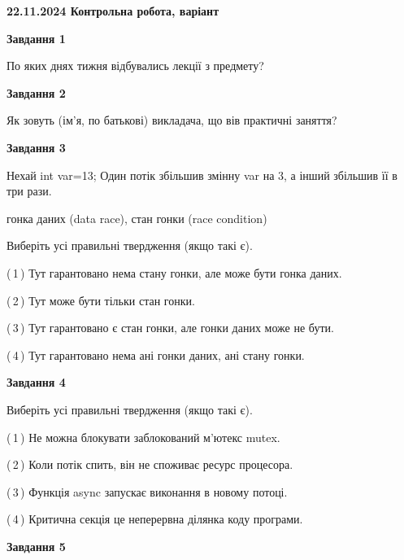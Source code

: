 \documentclass[12pt, ukrainian]{article}
\begin{document}
\begin {large}

\textbf{22.11.2024 Контрольна робота, варіант  }\par


{

\begin{center}
\textbf{Завдання 1}
\end{center}

По яких днях тижня відбувались лекції з предмету?


\begin{center}
\textbf{Завдання 2}
\end{center}

Як зовуть (ім'я, по батькові) викладача, що вів практичні заняття?


\begin{center}
\textbf{Завдання 3}
\end{center}

Нехай int var=13; Один потік збільшив змінну var на 3, а інший збільшив її в три рази.

гонка даних (data race), стан гонки (race condition)

Виберіть усі правильні твердження (якщо такі є).\par
\vspace{2mm}
(\,1\,) Тут гарантовано нема стану гонки, але може бути гонка даних.%

(\,2\,) Тут може бути тільки стан гонки.%

(\,3\,) Тут гарантовано є стан гонки, але гонки даних може не бути.%

(\,4\,) Тут гарантовано нема ані гонки даних, ані стану гонки.%


\begin{center}
\textbf{Завдання 4}
\end{center}

Виберіть усі правильні твердження (якщо такі є).\par
\vspace{2mm}

(\,1\,) Не можна блокувати заблокований м’ютекс mutex.%

(\,2\,) Коли потік спить, він не споживає ресурс процесора.%

(\,3\,) Функція async запускає виконання в новому потоці.%

(\,4\,) Критична секція це неперервна ділянка коду програми.%


\begin{center}
\textbf{Завдання 5}
\end{center}

}
\end{large}
\end{document}
